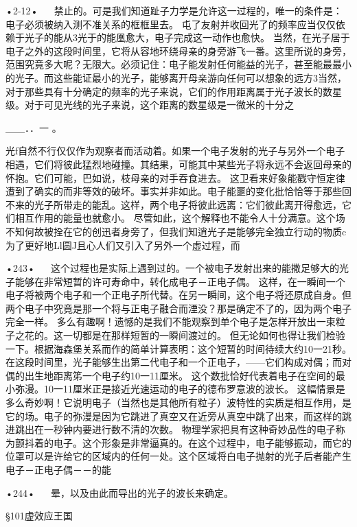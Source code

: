•2-12•
  
禁止的。可是我们知道趾子力学是允许这一过程的，唯一的条件是：电子必须被纳入测不准关系的框框里去。
屯了友射并收回光了的频率应当仅仅依赖于光子的能从3光于的能凰愈大，电子完成这一动作也愈快。
当然，在光子居于电子之外的这段时间里，它将从容地环绕母亲的身旁游飞一番。这里所说的身旁，范围究竟多大呢？无限大。必须记住：电子能发射任何能益的光子，甚至能最最小的光子。而这些能证最小的光子，能够离开母亲游向任何可以想象的远方3当然，对于那些具有十分确定的频率的光子来说，它们的作用距离属于光子波长的数星级。对于可见光线的光子来说，这个距离的数星级是一微米的十分之

＿＿．．一
。

光f自然不行仅仅作为观察者而活动着。如果一个电子发射的光子与另外一个电子相遇，它们将彼此猛烈地碰撞。其结果，可能其中某些光子将永远不会返回母亲的怀抱。它们可能，巴如说，枝母亲的对手吞食进去。
这卫看来好象能戳守恒定律遭到了确实的而非等效的破坏。事实并非如此。电子能噩的变化批恰恰等于那些回不来的光子所带走的能乱。这样，两个电子将彼此远离：它们彼此离开得愈远，它们相互作用的能量也就愈小。
尽管如此，这个解释也不能令人十分满意。这个场不知何故被拴在它的创迅者身旁了，但我们知逍光子是能够完全独立行动的物质c
为了更好地Ll圆J且心人们又引入了另外一个虚过程，而

•243•
  
这个过程也是实际上遇到过的。一个被电子发射出来的能撒足够大的光子能够在非常短暂的许可寿命中，转化成电子－正电子偶。
这样，在一瞬间一个电子将被两个电子和一个正电子所代替。在另一瞬间，这个电子将还原成自身。但两个电子中究竟是那一个将与正电子融合而湮没？那是确定不了的，因为两个电子完全一样。
多么有趣啊！遗憾的是我们不能观察到单个电子是怎样开放出一束粒子之花的。这一切都是在那样短暂的一瞬间渡过的。
但无论如何也得让我们检验一下。根据海森堡关系而作的简单计算表明：这个短暂的时间待续大约10一21秒。在这段时间里，光子能够生出第二代电子和一个正电子，——它们构成对偶；而对偶的出生地距离笫一个电子约10一11厘米。
这个数批恰好代表着电子在空间的最小弥漫。10一11厘米正是接近光速运动的电子的德布罗意波的波长。
这幅情景是多么奇妙啊！它说明电子（当然也是其他所有粒子）波特性的实质是相互作用，是它的场。电子的弥漫是因为它跳进了真空又在近旁从真空中跳了出来，而这样的跳进跳出在一秒钟内要进行数不清的次数。
物理学家把具有这种奇妙品性的电子称为颤抖着的电子。这个形象是非常逼真的。在这个过程中，电子能够振动，而它的位罩可以是许给它的区域内的任何一处。这个区域将白电子抛射的光子后者能产生电子－正电子偶－－的能

•244•
  
晕，以及由此而导出的光子的波长来确定。

§101虚效应王国


